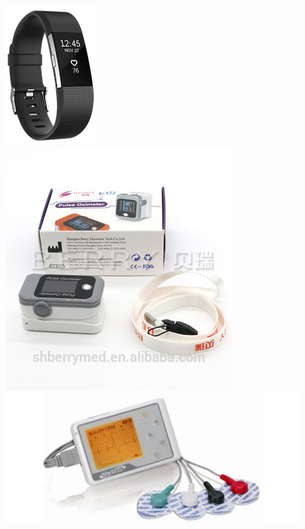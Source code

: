 \begin{figure}[H]
    \centering
	\includegraphics[scale=0.4]{images/fitbit.png}
    \includegraphics[scale=1]{images/ppg_clip.jpg}
	\includegraphics[scale=0.3]{images/ecg_1.jpg}	

\end{figure}
